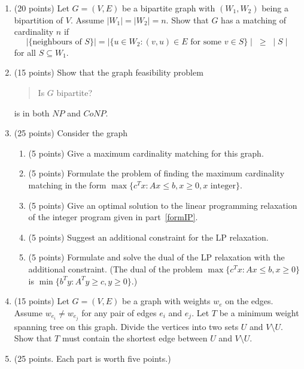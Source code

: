 \begin{enumerate}
   \item (20 points)
     Let $G=(V,E)$ be a bipartite graph with $(W_1,W_2)$ being a
     bipartition of $V$. Assume $\mid W_1\mid =\mid W_2\mid =n$.
     Show that $G$ has a matching of cardinality $n$ if
     \begin{displaymath}
       \mid \{ \mbox{neighbours of } S \} \mid =
       \mid \{u\in W_2: (v,u) \in E \mbox{ for some } v \in S \}\mid  \; \geq \;
               \mid S\mid
     \end{displaymath}
     for all $S \subseteq W_1$.
   \pagebreak
   \item (15 points)  Show that the graph feasibility problem
     \begin{quote}
       Is $G$ bipartite?
     \end{quote}
     is in both $NP$ and $CoNP$.
   \pagebreak
   \item (25 points)  Consider the graph
     \vspace{1in}
     \begin{enumerate}
       \item (5 points) Give a maximum cardinality matching for this graph.
       \item (5 points) \label{formIP}
         Formulate the problem of finding the maximum cardinality
         matching in the form
         $\max\{c^Tx : Ax \leq b, x \geq 0, x \mbox{ integer} \}$.
       \item (5 points) Give an optimal solution
         to the linear programming relaxation of the integer
         program given in part~\ref{formIP}.
       \item (5 points) Suggest an additional constraint for the LP relaxation.
       \item (5 points) Formulate and solve the dual of the LP relaxation with
         the additional constraint.
         (The dual of the problem $\max\{c^Tx : Ax \leq b, x \geq 0 \}$ is
         $\min\{b^Ty : A^Ty \geq c, y \geq 0 \}$.)
     \end{enumerate}
   \pagebreak
   \item (15 points)  Let $G=(V,E)$ be a graph with weights $w_e$ on the edges.
     Assume $w_{e_i}\neq w_{e_j}$ for any pair of edges $e_i$ and $e_j$.
     Let $T$ be a minimum weight
     spanning tree on this graph.  Divide the vertices into two sets
     $U$ and $V\setminus U$. Show that $T$ must contain the shortest
     edge between $U$ and $V \setminus U$.
   \pagebreak
   \item (25 points. Each part is worth five points.)

\end{enumerate}

